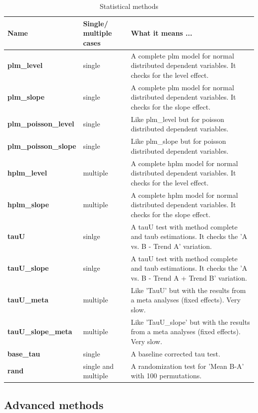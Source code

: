 \documentclass[
]{book}
\begin{document}
\begin{table}

\caption{\label{tab:table-mc-func}Statistical methods}
\begin{tabular}[t]{>{\raggedright\arraybackslash}p{10em}>{\raggedright\arraybackslash}p{7em}l}
\toprule
Name & Single/ multiple cases & What it means ...\\
\midrule
\textbf{plm\_level} & single & A complete plm model for normal distributed dependent variables. It checks for the level effect.\\
\textbf{plm\_slope} & single & A complete plm model for normal distributed dependent variables. It checks for the slope effect.\\
\textbf{plm\_poisson\_level} & single & Like plm\_level but for poisson distributed dependent variables.\\
\textbf{plm\_poisson\_slope} & single & Like plm\_slope but for poisson distributed dependent variables.\\
\textbf{hplm\_level} & multiple & A complete hplm model for normal distributed dependent variables. It checks for the level effect.\\
\textbf{hplm\_slope} & multiple & A complete hplm model for normal distributed dependent variables. It checks for the slope effect.\\
\textbf{tauU} & sinlge & A tauU test with method complete and taub estimations. It checks the 'A vs. B - Trend A' variation.\\
\textbf{tauU\_slope} & sinlge & A tauU test with method complete and taub estimations. It checks the 'A vs. B - Trend A + Trend B' variation.\\
\textbf{tauU\_meta} & multiple & Like 'TauU' but with the results from a meta analyses (fixed effects). Very slow.\\
\textbf{tauU\_slope\_meta} & multiple & Like 'TauU\_slope' but with the results from a meta analyses (fixed effects). Very slow.\\
\textbf{base\_tau} & single & A baseline corrected tau test.\\
\textbf{rand} & single and multiple & A randomization test for 'Mean B-A' with 100 permutations.\\
\bottomrule
\end{tabular}
\end{table}

\hypertarget{advanced-methods}{%
\subsection{Advanced methods}\label{advanced-methods}}
\end{document}
